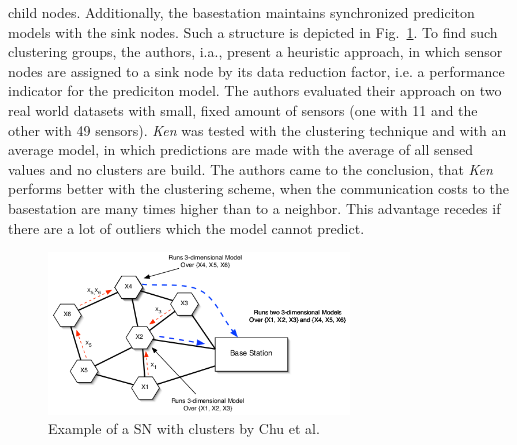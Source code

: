 child nodes. Additionally, the basestation maintains synchronized prediciton
models with the sink nodes. Such a structure is depicted in
Fig.~\ref{fig:cluster Chu}. To find such clustering groups, the authors, i.a.,
present a heuristic approach, in which sensor nodes are assigned to a sink node
by its data reduction factor, i.e. a performance indicator for the prediciton
model. The authors evaluated their approach on two real world datasets with
small, fixed amount of sensors (one with 11 and the other with 49 sensors).
\textit{Ken} was tested with the clustering technique and with an average
model, in which predictions are made with the average of all sensed values and
no clusters are build. The authors came to the conclusion, that \textit{Ken}
performs better with the clustering scheme, when the communication costs to the
basestation are many times higher than to a neighbor. This advantage recedes if
there are a lot of outliers which the model cannot predict.

\begin{figure}[h]
\includegraphics[width=8cm]{images/ken-clustering.png}
\caption{Example of a \ac{SN} with clusters by Chu et al.~\cite{chu2006approximate}}
\label{fig:cluster Chu}
\centering
\end{figure}

